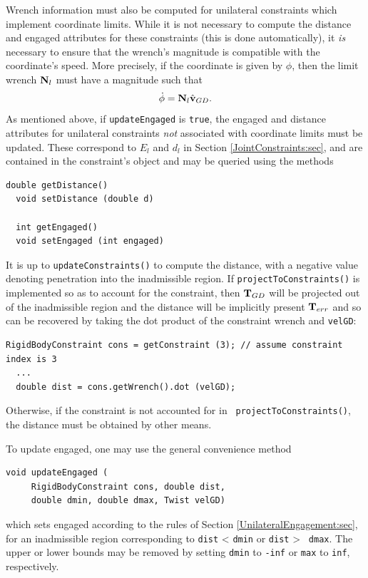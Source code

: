 Wrench information must also be computed for unilateral constraints
which implement coordinate limits. While it is not necessary to
compute the {\sf distance} and {\sf engaged} attributes for these
constraints (this is done automatically), it {\it is} necessary to
ensure that the wrench's magnitude is compatible with the coordinate's
speed. More precisely, if the coordinate is given by $\phi$, then the
limit wrench ${\bf N}_l$ must have a magnitude such that
%
\begin{equation}
\dot\phi = {\bf N}_l \hat{{\bf v}}_{GD}.
\end{equation}
%
As mentioned above, if {\tt updateEngaged} is {\tt true}, the {\sf
engaged} and {\sf distance} attributes for unilateral constraints {\it not}
associated with coordinate limits must be updated.  These correspond
to $E_l$ and $d_l$ in Section \ref{JointConstraints:sec}, and are
contained in the constraint's
 object and may
be queried using the methods
\begin{lstlisting}[]
  double getDistance()
  void setDistance (double d)

  int getEngaged()
  void setEngaged (int engaged)
\end{lstlisting}
%
It is up to {\tt updateConstraints()} to compute the distance, with
a negative value denoting penetration into the inadmissible
region. If {\tt projectToConstraints()} is
implemented so as to account for the constraint, then ${\bf T}_{GD}$ will
be projected out of the inadmissible region and the distance will be
implicitly present ${\bf T}_{err}$ and so can be recovered by taking
the dot product of the constraint wrench and {\tt velGD}:
%
\begin{lstlisting}[]
  RigidBodyConstraint cons = getConstraint (3); // assume constraint index is 3
  ...
  double dist = cons.getWrench().dot (velGD);
\end{lstlisting}
%
Otherwise, if the constraint is not accounted for in {\tt
projectToConstraints()}, the distance must be obtained by other means.

To update {\sf engaged}, one may use the general convenience method
%
\begin{lstlisting}[]
  void updateEngaged (
     RigidBodyConstraint cons, double dist, 
     double dmin, double dmax, Twist velGD)
\end{lstlisting}
%
which sets {\sf engaged} according to the rules of Section
\ref{UnilateralEngagement:sec}, for an inadmissible region
corresponding to {\tt dist} < {\tt dmin} or {\tt dist} > {\tt
dmax}. The upper or lower bounds may be removed by setting {\tt dmin}
to {\tt -inf} or {\tt max} to {\tt inf}, respectively.

